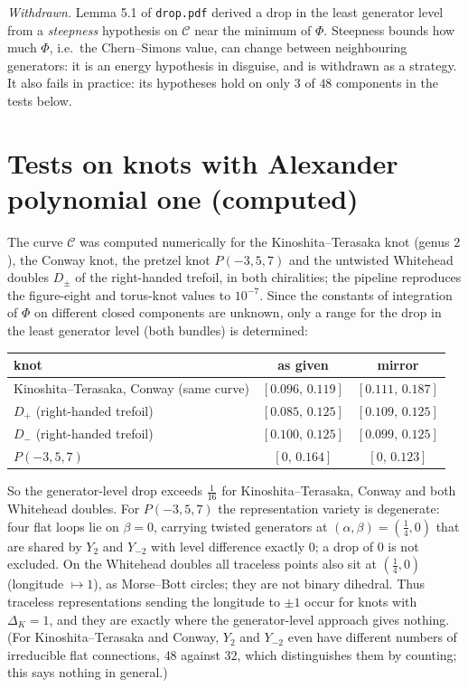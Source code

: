 \documentclass[10pt]{amsart}
\numberwithin{equation}{section}
\newcommand{\st}[1]{\par\noindent\textit{#1}\enspace}
\begin{document}
\st{Withdrawn.} Lemma 5.1 of \texttt{drop.pdf} derived a drop in the least
generator level from a \emph{steepness} hypothesis on $\mathcal C$ near the
minimum of $\Phi$. Steepness bounds how much $\Phi$, i.e.\ the Chern--Simons
value, can change between neighbouring generators: it is an energy
hypothesis in disguise, and is withdrawn as a strategy. It also fails in
practice: its hypotheses hold on only $3$ of $48$ components in the tests
below.

\section{Tests on knots with Alexander polynomial one (computed)}

The curve $\mathcal C$ was computed numerically for the Kinoshita--Terasaka
knot (genus $2$), the Conway knot, the pretzel knot $P(-3,5,7)$ and the
untwisted Whitehead doubles $D_\pm$ of the right-handed trefoil, in both
chiralities; the pipeline reproduces the figure-eight and torus-knot values to
$10^{-7}$. Since the constants of integration of $\Phi$ on different closed
components are unknown, only a range for the drop in the least generator
level (both bundles) is determined:

\begin{center}\small
\begin{tabular}{lcc}
knot & as given & mirror\\\hline
Kinoshita--Terasaka, Conway (same curve) & $[0.096,\,0.119]$ & $[0.111,\,0.187]$\\
$D_+$ (right-handed trefoil) & $[0.085,\,0.125]$ & $[0.109,\,0.125]$\\
$D_-$ (right-handed trefoil) & $[0.100,\,0.125]$ & $[0.099,\,0.125]$\\
$P(-3,5,7)$ & $[0,\,0.164]$ & $[0,\,0.123]$
\end{tabular}
\end{center}

\noindent So the generator-level drop exceeds $\frac1{16}$ for
Kinoshita--Terasaka, Conway and both Whitehead doubles. For $P(-3,5,7)$ the
representation variety is degenerate: four flat loops lie on $\beta=0$,
carrying twisted generators at $(\alpha,\beta)=(\frac14,0)$ that are shared by
$Y_2$ and $Y_{-2}$ with level difference exactly $0$; a drop of $0$ is not
excluded. On the Whitehead doubles all traceless points also sit at
$(\frac14,0)$ (longitude $\mapsto1$), as Morse--Bott circles; they are not
binary dihedral. Thus traceless representations sending the longitude to
$\pm1$ occur for knots with $\Delta_K=1$, and they are exactly where the
generator-level approach gives nothing. (For Kinoshita--Terasaka and Conway,
$Y_2$ and $Y_{-2}$ even have different numbers of irreducible flat
connections, $48$ against $32$, which distinguishes them by counting; this
says nothing in general.)
\end{document}
